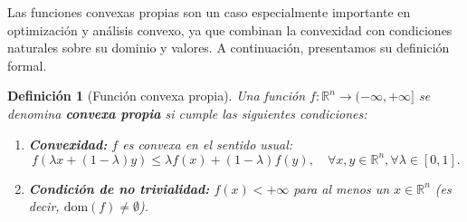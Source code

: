\documentclass[12pt]{book}
\newtheorem{definition}{Definición}
\theoremstyle{definition}
\theoremstyle{plain}
\theoremstyle{remark}
\begin{document}

Las funciones convexas propias son un caso especialmente importante en optimización y análisis convexo, ya que combinan la convexidad con condiciones naturales sobre su dominio y valores. A continuación, presentamos su definición formal. %

\begin{definition}[Función convexa propia]
Una función \( f: \mathbb{R}^n \to (-\infty, +\infty] \) se denomina \textbf{convexa propia} si cumple las siguientes condiciones:
\begin{enumerate}
    \item \textbf{Convexidad:} \( f \) es convexa en el sentido usual:
    \[
    f(\lambda x + (1-\lambda) y) \leq \lambda f(x) + (1-\lambda) f(y), \quad \forall x, y \in \mathbb{R}^n, \forall \lambda \in [0,1].
    \]
    \item \textbf{Condición de no trivialidad:} \( f(x) < +\infty \) para al menos un \( x \in \mathbb{R}^n \) (es decir, \( \text{dom}(f) \neq \emptyset \)).
\end{enumerate}
\end{definition}


\end{document}
